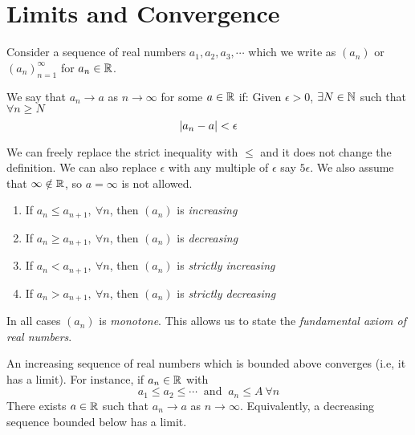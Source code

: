 \documentclass{article}
\numberwithin{equation}{section}
\begin{document}

\section{Limits and Convergence}
Consider a sequence of real numbers $a_1, a_2, a_3, \cdots$ which we write as $(a_n)$ or $(a_n)_{n=1}^\infty$ for $a_n \in \mathbb{R}$.

\begin{defi}[Limit]
    We say that $a_n \rightarrow a$ as $n \rightarrow \infty$ for some $a \in \mathbb{R}$ if:
    Given $\epsilon > 0$, $\exists N \in \mathbb{N}$ such that $\forall n \geq N$
    \[\left\lvert a_n - a\right\rvert < \epsilon\]
\end{defi}

\begin{remark}
    We can freely replace the strict inequality with $\leq$ and it does not change the definition. 
    We can also replace $\epsilon$ with any multiple of $\epsilon$ say $5 \epsilon$.
    We also assume that $\infty \notin \mathbb{R}$, so $a = \infty$ is not allowed.
\end{remark}
\begin{defi}\leavevmode
    \begin{enumerate}
        \item If $a_n \leq a_{n+1}, \ \forall n$, then $(a_n)$ is \emph{increasing}
        \item If $a_n \geq a_{n+1}, \ \forall n$, then $(a_n)$ is \emph{decreasing} 
        \item If $a_n < a_{n+1}, \ \forall n$, then $(a_n)$ is \emph{strictly increasing} 
        \item If $a_n > a_{n+1}, \ \forall n$, then $(a_n)$ is \emph{strictly decreasing} 
    \end{enumerate}
\end{defi}

In all cases $(a_n)$ is \emph{monotone}. This allows us to state the \emph{fundamental axiom of real numbers}.

\begin{thm}
    An increasing sequence of real numbers which is bounded above converges (i.e, it has a limit).
    For instance, if $a_n \in \mathbb{R}$ with
    \[a_1 \leq a_2 \leq \cdots \ \text{ and } \ a_n \leq A \ \forall n\]
    There exists $a \in \mathbb{R}$ such that $a_n \rightarrow a$ as $n \rightarrow \infty$.
    Equivalently, a decreasing sequence bounded below has a limit.
\end{thm}
\end{document}
